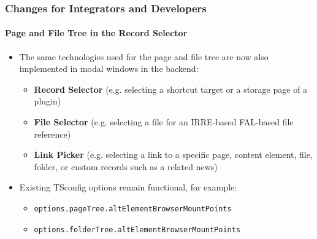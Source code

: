 %

\begin{frame}[fragile]
	\frametitle{Changes for Integrators and Developers}
	\framesubtitle{Page and File Tree in the Record Selector}


	\begin{itemize}
		\item The same technologies used for the page and file tree are now also
			implemented in modal windows in the backend:
			\begin{itemize}\normalsize
				\item \textbf{Record Selector}\newline
					\smaller(e.g. selecting a shortcut target or a storage page of a plugin)\normalsize
				\item \textbf{File Selector}\newline
				 	\smaller(e.g. selecting a file for an IRRE-based FAL-based file reference)\normalsize
				\item \textbf{Link Picker}\newline
					\smaller(e.g. selecting a link to a specific page, content element, file, folder, or custom records such as a related news)\normalsize
			\end{itemize}

		\item Existing TSconfig options remain functional, for example:

			\begin{itemize}\smaller
				\item \texttt{options.pageTree.altElementBrowserMountPoints}
				\item \texttt{options.folderTree.altElementBrowserMountPoints}
			\end{itemize}\smaller
	\end{itemize}

\end{frame}


